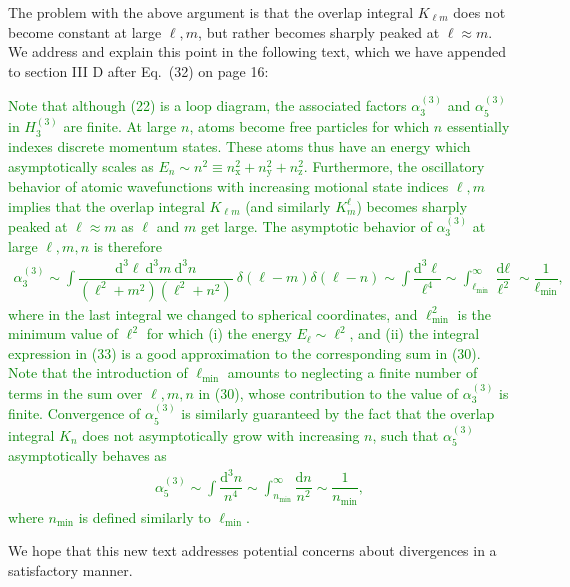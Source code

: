 \documentclass[preprint]{revtex4-1}
\renewcommand{\t}{\text} %
\newcommand{\f}{\dfrac} %
\newcommand{\p}[1]{\left(#1\right)} %
\renewcommand{\d}{\text{d}}
\newcommand{\x}{\text{x}}
\newcommand{\y}{\text{y}}
\newcommand{\z}{\text{z}}
\newcommand{\1}{\mathds{1}}
\newcommand{\green}[1]{\textcolor{green}{#1}}
\begin{document}
\begin{enumerate}
  The problem with the above argument is that the overlap integral
  $K_{\ell m}$ does not become constant at large $\ell,m$, but rather
  becomes sharply peaked at $\ell\approx m$.  We address and explain
  this point in the following text, which we have appended to section
  III D after Eq.~(32) on page 16:

  \green{Note that although (22) is a loop diagram, the associated
    factors $\alpha_3^{(3)}$ and $\alpha_5^{(3)}$ in $H_3^{(3)}$ are
    finite.  At large $n$, atoms become free particles for which $n$
    essentially indexes discrete momentum states.  These atoms thus
    have an energy which asymptotically scales as
    $E_n\sim n^2\equiv n_\x^2+n_\y^2+n_\z^2$.  Furthermore, the
    oscillatory behavior of atomic wavefunctions with increasing
    motional state indices $\ell,m$ implies that the overlap integral
    $K_{\ell m}$ (and similarly $K^\ell_m$) becomes sharply peaked at
    $\ell\approx m$ as $\ell$ and $m$ get large.  The asymptotic
    behavior of $\alpha_3^{(3)}$ at large $\ell,m,n$ is therefore
    \begin{align*}
      \alpha_3^{(3)}
      \sim \int \f{\d^3\ell~\d^3m~\d^3n}{\p{\ell^2+m^2}\p{\ell^2+n^2}}
      ~\delta\p{\ell-m}\delta\p{\ell-n}
      \sim \int \f{\d^3\ell}{\ell^4}
      \sim \int_{\ell_{\t{min}}}^\infty \f{\d\ell}{\ell^2}
      \sim \f1{\ell_{\t{min}}},
      \tag{33}
    \end{align*}
    where in the last integral we changed to spherical coordinates,
    and $\ell_{\t{min}}^2$ is the minimum value of $\ell^2$ for which
    (i) the energy $E_\ell\sim\ell^2$, and (ii) the integral
    expression in (33) is a good approximation to the corresponding
    sum in (30).  Note that the introduction of $\ell_{\t{min}}$
    amounts to neglecting a finite number of terms in the sum over
    $\ell,m,n$ in (30), whose contribution to the value of
    $\alpha_3^{(3)}$ is finite.  Convergence of $\alpha_5^{(3)}$ is
    similarly guaranteed by the fact that the overlap integral $K_n$
    does not asymptotically grow with increasing $n$, such that
    $\alpha_5^{(3)}$ asymptotically behaves as
    \begin{align*}
      \alpha_5^{(3)} \sim \int \f{\d^3 n}{n^4}
      \sim \int_{n_{\t{min}}}^\infty \f{\d n}{n^2}
      \sim \f1{n_{\t{min}}},
      \tag{34}
    \end{align*}
    where $n_{\t{min}}$ is defined similarly to $\ell_{\t{min}}$.}

  We hope that this new text addresses potential concerns about
  divergences in a satisfactory manner.



\end{enumerate}
\end{document}
